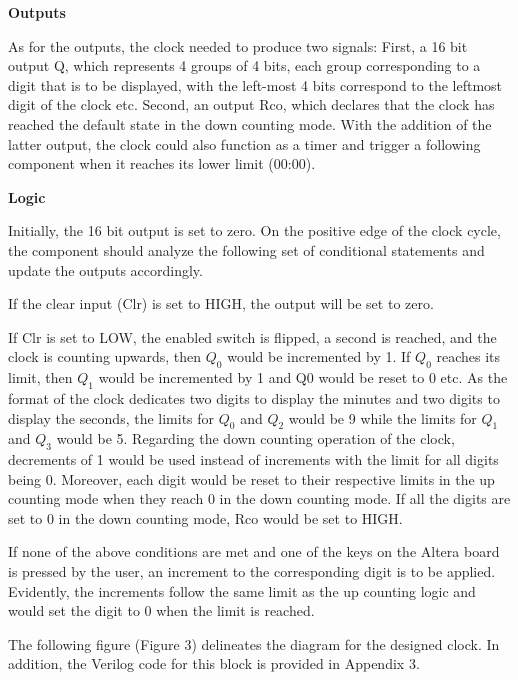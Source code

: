 \documentclass[12pt,a4paper]{article}
\begin{document}
	\vspace{0.2cm}
	\noindent \textbf{Outputs}
	\vspace{0.1cm}
	
	\noindent As for the outputs, the clock needed to produce two signals: First, a 16 bit output Q, which represents 4 groups of 4 bits, each group corresponding to a digit that is to be displayed, with the left-most 4 bits correspond to the leftmost digit of the clock etc. Second, an output Rco, which declares that the clock has reached the default state in the down counting mode. With the addition of the latter output, the clock could also function as a timer and trigger a following component when it reaches its lower limit (00:00).
	
	\vspace{0.2cm}
	\noindent \textbf{Logic}
	\vspace{0.1cm}
	
	\noindent Initially, the 16 bit output is set to zero. On the positive edge of the clock cycle, the component should analyze the following set of conditional statements and update the outputs accordingly.
	
	\noindent If the clear input (Clr) is set to HIGH, the output will be set to zero. 
	
	\noindent If Clr is set to LOW, the enabled switch is flipped, a second is reached, and the clock is counting upwards, then $Q_{0}$ would be incremented by 1. If $Q_{0}$ reaches its limit, then $Q_{1}$ would be incremented by 1 and Q0 would be reset to 0 etc. As the format of the clock dedicates two digits to display the minutes and two digits to display the seconds, the limits for $Q_{0}$ and $Q_{2}$ would be 9 while the limits for $Q_{1}$ and $Q_{3}$ would be 5. Regarding the down counting operation of the clock, decrements of 1 would be used instead of increments with the limit for all digits being 0. Moreover, each digit would be reset to their respective limits in the up counting mode when they reach 0 in the down counting mode. If all the digits are set to 0 in the down counting mode, Rco would be set to HIGH.
	
	\noindent If none of the above conditions are met and one of the keys on the Altera board is pressed by the user, an increment to the corresponding digit is to be applied. Evidently, the increments follow the same limit as the up counting logic and would set the digit to 0 when the limit is reached.
	  

	\vspace{0.2cm}
	\noindent The following figure (Figure 3) delineates the diagram for the designed clock. In addition, the Verilog code for this block is provided in Appendix 3.
\end{document}
